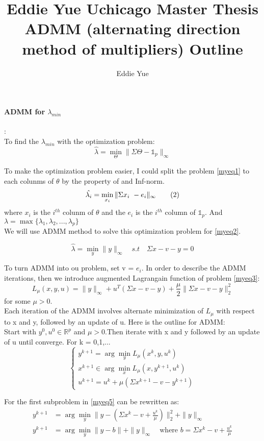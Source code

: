 \documentclass[a4paper,11pt]{article}
\author{Eddie Yue}
\title{Eddie Yue Uchicago Master Thesis \\
         \vspace{3 mm} \large ADMM (alternating direction method of multipliers) Outline}
\begin{document}
 
	\paragraph{ADMM for $\lambda_{min}$}: \\
	To find the $\lambda_{min}$ with the optimization problem:
	\[
	\hat{\lambda} = \min_\Theta \|\Sigma\Theta - \mathds{1}_p\|_\infty
	\tag{1}\label{myeq1}
	\] 
	
	To make the optimization problem easier, I could split the problem \eqref{myeq1} to each colunms of $\theta$ by the property of and Inf-norm.
	\[ \hat{\lambda_i} = \min_{x_i} 
	\|\Sigma\*x_i\ - e_i\|_\infty
	\tag{2}\label{myeq2} \]
	where $x_i$ is the $i^{th}$ colunm of $\theta$ and the $e_i$ is the $i^{th}$ column of $\mathds{1}_p $. And $\lambda = \max \{\lambda_1, \lambda_2, ..., \lambda_p\}$\\
	
	We will use ADMM method to solve this optimization problem for \eqref{myeq2}.
	
	\[
	\hat{\lambda} = \min_y \|y\|_\infty
	\quad s.t \quad \Sigma{x} - v - y = 0
	\tag{3}\label{myeq3}
	\] 
	
	To turn ADMM into ou problem, set v = $e_i$. In order to describe the ADMM iterations,	then we introduce augmented Lagrangain function of problem \eqref{myeq3}:
	\[
	L_\mu(x,y,u) = \|y\|_\infty + u^T(\Sigma{x}- v - y) + \frac{\mu}{2}\|\Sigma{x}-v- y\|_{2}^2
	\tag{4}\label{myeq4}
	\]
	for some $\mu > 0$. \\

	Each iteration of the ADMM involves alternate minimization of $L_\mu$ with respect to x and y, followed by an update of u. Here is the outline for ADMM:\\
	
	Start with $y^0 , u^0 \in \mathbb{R}^p$ and $ \mu > 0$.Then iterate with x and y followed by an update of u until converge. For k = 0,1,...
	\[\left\{
	\begin{array}{lr}
	y^{k+1} = \arg\!\min_y L_\mu(x^k,y,u^k) \\
	x^{k+1} \in \arg\!\min_x L_\mu(x,y^{k+1},u^k)\\
	u^{k+1} = u^k +\mu(\Sigma{x^{k+1}}-v-y^{k+1})
	\end{array}
	\right.
	\tag{5}\label{myeq5}
	\]
	
	For the first subproblem in \eqref{myeq5} can be rewritten as:
	\begin{align*}
	y^{k+1} &= \arg\!\min_y \|y - (\Sigma{x^k}-v+\frac{u^k}{\mu})\|_{2}^2 + \|y\|_\infty\\
	y^{k+1} &= \arg\!\min_y \|y - b\| + \|y\|_\infty \quad \text{where } b = \Sigma{x^k}-v+\frac{u^k}{\mu}
	\tag{6}\label{myeq6}
	\end{align*}
\end{document}
